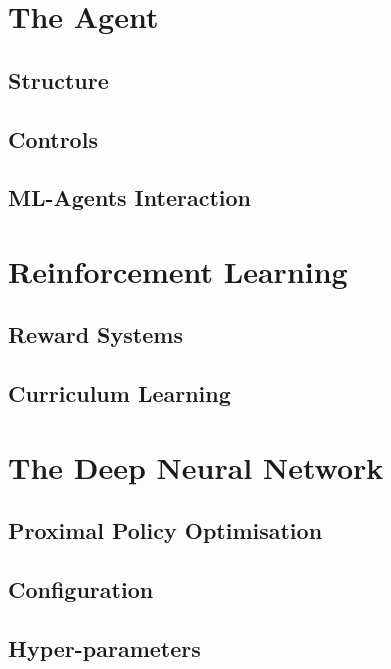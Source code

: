 \documentclass{article}
\begin{document}
\section{The Agent}
\lipsum[2][1]

\subsection{Structure}
\lipsum[2][1]

\subsection{Controls}
\lipsum[2][1]

\subsection{ML-Agents Interaction}
\lipsum[2][1]

\section{Reinforcement Learning}
\lipsum[2][1]

\subsection{Reward Systems}
\lipsum[2][1]

\subsection{Curriculum Learning}
\lipsum[2][1]

\section{The Deep Neural Network}
\lipsum[2][1]

\subsection{Proximal Policy Optimisation}
\lipsum[2][1]

\subsection{Configuration}
\lipsum[2][1]

\subsection{Hyper-parameters}
\lipsum[2][1]
\end{document}
